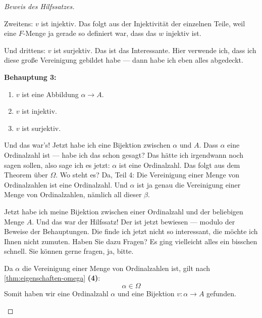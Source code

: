 \begin{proof}[Beweis des Hilfssatzes]
\begin{spoken-clean}[00:51:10 - 00:52:40]
Zweitens: $v$ ist injektiv. Das folgt aus der Injektivität der einzelnen Teile, weil eine $F$-Menge ja gerade so definiert war, dass das $w$ injektiv ist. 

Und drittens: $v$ ist surjektiv. Das ist das Interessante. Hier verwende ich, dass ich diese große Vereinigung gebildet habe --- dann habe ich eben alles abgedeckt.
\end{spoken-clean}

\begin{math-stroke}
\textbf{Behauptung 3:}
\begin{enumerate}[label=\textbf{(\roman*)}]
    \item $v$ ist eine Abbildung $\alpha \to A$.
    \item $v$ ist injektiv.
    \item $v$ ist surjektiv.
\end{enumerate}
\end{math-stroke}

\begin{spoken-clean}[00:52:40 - 00:54:40]
Und das war's! Jetzt habe ich eine Bijektion zwischen $\alpha$ und $A$. Dass $\alpha$ eine Ordinalzahl ist --- habe ich das schon gesagt? Das hätte ich irgendwann noch sagen sollen, also sage ich es jetzt: $\alpha$ ist eine Ordinalzahl. Das folgt aus dem Theorem über $\Omega$. Wo steht es? Da, Teil 4: Die Vereinigung einer Menge von Ordinalzahlen ist eine Ordinalzahl. Und $\alpha$ ist ja genau die Vereinigung einer Menge von Ordinalzahlen, nämlich all dieser $\beta$.

Jetzt habe ich meine Bijektion zwischen einer Ordinalzahl und der beliebigen Menge $A$. Und das war der Hilfssatz! Der ist jetzt bewiesen --- modulo der Beweise der Behauptungen. Die finde ich jetzt nicht so interessant, die möchte ich Ihnen nicht zumuten. Haben Sie dazu Fragen? Es ging vielleicht alles ein bisschen schnell. Sie können gerne fragen, ja, bitte.
\end{spoken-clean}

\begin{math-stroke}
Da $\alpha$ die Vereinigung einer Menge von Ordinalzahlen ist, gilt nach \cref{thm:eigenschaften-omega} \textbf{(4)}:
\[
\alpha \in \Omega
\]
Somit haben wir eine Ordinalzahl $\alpha$ und eine Bijektion $v: \alpha \to A$ gefunden.
\end{math-stroke}
\end{proof}

\begin{ai-global-state-checkpoint-invisible-content}
\end{ai-global-state-checkpoint-invisible-content}

